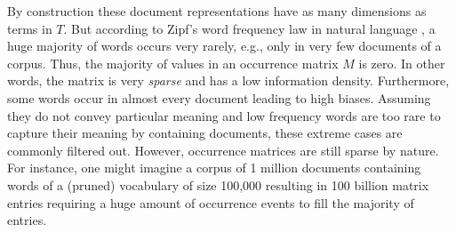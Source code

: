 By construction these document representations have as many dimensions as terms in $T$. But according to Zipf’s word frequency law in natural language \autocite{zipf_psychobiology_1935}, a huge majority of words occurs very rarely, e.g., only in very few documents of a corpus. Thus, the majority of values in an occurrence matrix $M$ is zero. In other words, the matrix is very \textit{sparse} and has a low information density. Furthermore, some words occur in almost every document leading to high biases. Assuming they do not convey particular meaning and low frequency words are too rare to capture their meaning by containing documents, these extreme cases are commonly filtered out. However, occurrence matrices are still sparse by nature. For instance, one might imagine a corpus of 1 million documents containing words of a (pruned) vocabulary of size 100,000 resulting in 100 billion matrix entries requiring a huge amount of occurrence events to fill the majority of entries.%

